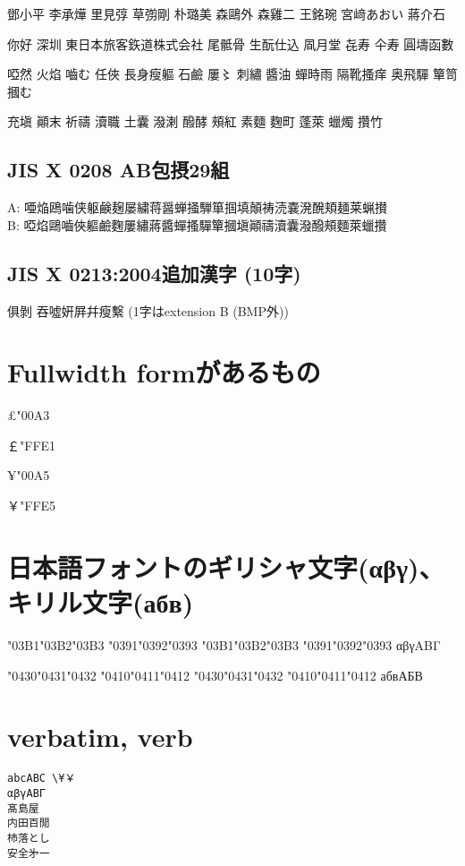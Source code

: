 \documentclass{utarticle}
\begin{document}
鄧小平 李承燁 里見弴 草彅剛 朴璐美 森鷗外 森雞二 王銘琬 宮﨑あおい 蔣介石

你好 深圳 東日本旅客鉃道株式会社 尾骶骨 生酛仕込 凮月堂 㐂寿 仐寿 圓壔函數

啞然 火焰 嚙む 任俠 長身瘦軀 石鹼 屢〻 刺繡 醬油 蟬時雨 隔靴搔痒 奥飛驒 簞笥 摑む

充塡 顚末 祈禱 瀆職 土囊 潑溂 醱酵 頰紅 素麵 麴町 蓬萊 蠟燭 攢竹

\subsection{JIS X 0208 AB包摂29組}
{\gt
\noindent
A: 唖焔鴎噛侠躯鹸麹屡繍蒋醤蝉掻騨箪掴填顛祷涜嚢溌醗頬麺莱蝋攅\\
B: 啞焰鷗嚙俠軀鹼麴屢繡蔣醬蟬搔驒簞摑塡顚禱瀆囊潑醱頰麵萊蠟攢
}

\subsection{JIS X 0213:2004追加漢字 (10字)}
俱剝%
吞噓姸屛幷瘦繫 (1字はextension B (BMP外))

\section{Fullwidth formがあるもの}
£\kchar\ucs"00A3%

￡\kchar\ucs"FFE1%

¥\kchar\ucs"00A5%

￥\kchar\ucs"FFE5%


\section{日本語フォントのギリシャ文字(αβγ)、キリル文字(абв)}
\char\ucs"03B1\char\ucs"03B2\char\ucs"03B3
\char\ucs"0391\char\ucs"0392\char\ucs"0393
\quad
\char"03B1\char"03B2\char"03B3
\char"0391\char"0392\char"0393
\quad
αβγΑΒΓ

\char\ucs"0430\char\ucs"0431\char\ucs"0432
\char\ucs"0410\char\ucs"0411\char\ucs"0412
\quad
\char"0430\char"0431\char"0432
\char"0410\char"0411\char"0412
\quad
абвАБВ

\section{verbatim, verb}
\begin{verbatim}
abcABC \¥￥
αβγΑΒΓ
髙島屋
内田百閒
杮落とし
安全﻿㐧一
\end{verbatim}
\end{document}
